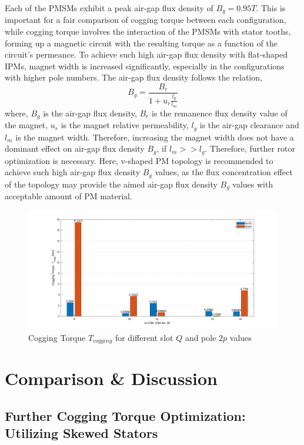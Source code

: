 \documentclass [a4 paper, 11pt, titlepage] {article}
\begin{document}
	Each of the PMSMs exhibit a peak air-gap flux density of $B_g=0.95T$. This is important for a fair comparison of cogging torque between each configuration, while cogging torque involves the interaction of the PMSMs with stator tooths, forming up a magnetic circuit with the resulting torque as a function of the circuit's permeance. To achieve such high air-gap flux density with flat-shaped IPMs, magnet width is increased significantly, especially in the configurations with higher pole numbers. The air-gap flux density follows the relation,
	\begin{equation}
		B_g=\frac{B_r}{1+u_r\frac{l_g}{l_m}}
	\end{equation}
	where, $B_g$ is the air-gap flux density, $B_r$ is the remanence flux density value of the magnet, $u_r$ is the magnet relative permeability, $l_g$ is the air-gap clearance and $l_m$ is the magnet width. Therefore, increasing the magnet width does not have a dominant effect on air-gap flux density $B_g$, if $l_m>>l_g$. Therefore, further rotor optimization is necessary. Here, v-shaped PM topology is recommended to achieve such high air-gap flux density $B_g$ values, as the flux concentration effect of the topology may provide the aimed air-gap flux density $B_g$ values with acceptable amount of PM material.
	
	
	\begin{figure}[h]
		\includegraphics[width=\textwidth]{Tcogg_lvl1.png}
		\caption{Cogging Torque $T_{cogging}$ for different slot $Q$ and pole $2p$ values}
		\label{fig:coggingTorquelvl1}
	\end{figure}
	
	
	
	\section{Comparison \& Discussion}
	
	\subsection{Further Cogging Torque Optimization: Utilizing Skewed Stators}
	
\end{document}
